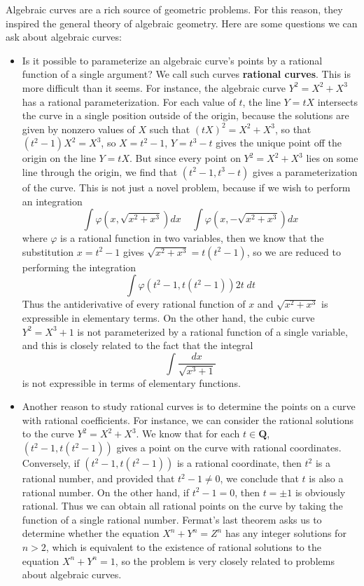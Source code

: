 Algebraic curves are a rich source of geometric problems. For this reason, they inspired the general theory of algebraic geometry. Here are some questions we can ask about algebraic curves:
%
\begin{itemize}
    \item Is it possible to parameterize an algebraic curve's points by a rational function of a single argument? We call such curves {\bf rational curves}. This is more difficult than it seems. For instance, the algebraic curve $Y^2 = X^2 + X^3$ has a rational parameterization. For each value of $t$, the line $Y = tX$ intersects the curve in a single position outside of the origin, because the solutions are given by nonzero values of $X$ such that $(tX)^2 = X^2 + X^3$, so that $(t^2 - 1)X^2 = X^3$, so $X = t^2 - 1$, $Y = t^3 - t$ gives the unique point off the origin on the line $Y = tX$. But since every point on $Y^2 = X^2 + X^3$ lies on some line through the origin, we find that $(t^2 - 1, t^3 - t)$ gives a parameterization of the curve. This is not just a novel problem, because if we wish to perform an integration
    \[ \int \varphi \left(x, \sqrt{x^2 + x^3} \right) dx\ \ \ \ \ \int \varphi \left( x, - \sqrt{x^2 + x^3} \right) dx \]
    where $\varphi$ is a rational function in two variables, then we know that the substitution $x = t^2 - 1$ gives $\sqrt{x^2 + x^3} = t(t^2 - 1)$, so we are reduced to performing the integration
    \[ \int \varphi(t^2 - 1, t(t^2 - 1)) 2t\; dt \]
    Thus the antiderivative of every rational function of $x$ and $\sqrt{x^2 + x^3}$ is expressible in elementary terms. On the other hand, the cubic curve $Y^2 = X^3 + 1$ is not parameterized by a rational function of a single variable, and this is closely related to the fact that the integral
    \[ \int \frac{dx}{\sqrt{x^3 + 1}} \]
    is not expressible in terms of elementary functions.

    \item Another reason to study rational curves is to determine the points on a curve with rational coefficients. For instance, we can consider the rational solutions to the curve $Y^2 = X^2 + X^3$. We know that for each $t \in \mathbf{Q}$, $(t^2 - 1, t(t^2 - 1))$ gives a point on the curve with rational coordinates. Conversely, if $(t^2 - 1, t(t^2 - 1))$ is a rational coordinate, then $t^2$ is a rational number, and provided that $t^2 - 1 \neq 0$, we conclude that $t$ is also a rational number. On the other hand, if $t^2 - 1 = 0$, then $t = \pm 1$ is obviously rational. Thus we can obtain all rational points on the curve by taking the function of a single rational number. Fermat's last theorem asks us to determine whether the equation $X^n + Y^n = Z^n$ has any integer solutions for $n > 2$, which is equivalent to the existence of rational solutions to the equation $X^n + Y^n = 1$, so the problem is very closely related to problems about algebraic curves.


\end{itemize}
